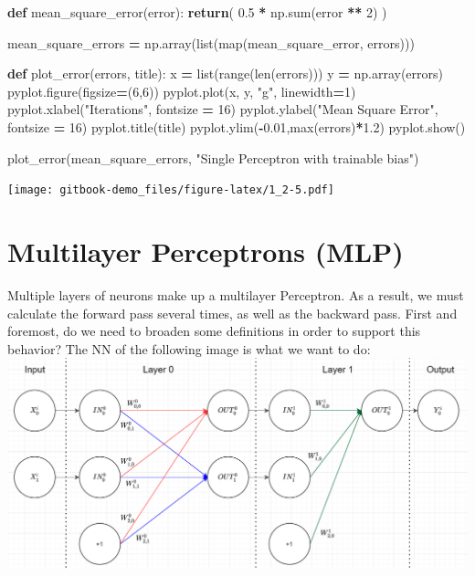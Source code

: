 \documentclass[
]{book}
\newenvironment{Shaded}{\begin{snugshade}}{\end{snugshade}}
\newcommand{\BuiltInTok}[1]{#1}
\newcommand{\ControlFlowTok}[1]{\textcolor[rgb]{0.13,0.29,0.53}{\textbf{#1}}}
\newcommand{\DecValTok}[1]{\textcolor[rgb]{0.00,0.00,0.81}{#1}}
\newcommand{\FloatTok}[1]{\textcolor[rgb]{0.00,0.00,0.81}{#1}}
\newcommand{\KeywordTok}[1]{\textcolor[rgb]{0.13,0.29,0.53}{\textbf{#1}}}
\newcommand{\NormalTok}[1]{#1}
\newcommand{\OperatorTok}[1]{\textcolor[rgb]{0.81,0.36,0.00}{\textbf{#1}}}
\newcommand{\StringTok}[1]{\textcolor[rgb]{0.31,0.60,0.02}{#1}}
\begin{document}
\begin{Shaded}
\begin{Highlighting}[]
  
  
\KeywordTok{def}\NormalTok{ mean\_square\_error(error):}
  \ControlFlowTok{return}\NormalTok{( }\FloatTok{0.5} \OperatorTok{*}\NormalTok{ np.}\BuiltInTok{sum}\NormalTok{(error }\OperatorTok{**} \DecValTok{2}\NormalTok{) )}


\NormalTok{mean\_square\_errors }\OperatorTok{=}\NormalTok{ np.array(}\BuiltInTok{list}\NormalTok{(}\BuiltInTok{map}\NormalTok{(mean\_square\_error, errors)))}


\KeywordTok{def}\NormalTok{ plot\_error(errors, title):}
\NormalTok{  x }\OperatorTok{=} \BuiltInTok{list}\NormalTok{(}\BuiltInTok{range}\NormalTok{(}\BuiltInTok{len}\NormalTok{(errors)))}
\NormalTok{  y }\OperatorTok{=}\NormalTok{ np.array(errors)}
\NormalTok{  pyplot.figure(figsize}\OperatorTok{=}\NormalTok{(}\DecValTok{6}\NormalTok{,}\DecValTok{6}\NormalTok{))}
\NormalTok{  pyplot.plot(x, y, }\StringTok{"g"}\NormalTok{, linewidth}\OperatorTok{=}\DecValTok{1}\NormalTok{)}
\NormalTok{  pyplot.xlabel(}\StringTok{"Iterations"}\NormalTok{, fontsize }\OperatorTok{=} \DecValTok{16}\NormalTok{)}
\NormalTok{  pyplot.ylabel(}\StringTok{"Mean Square Error"}\NormalTok{, fontsize }\OperatorTok{=} \DecValTok{16}\NormalTok{)}
\NormalTok{  pyplot.title(title)}
\NormalTok{  pyplot.ylim(}\OperatorTok{{-}}\FloatTok{0.01}\NormalTok{,}\BuiltInTok{max}\NormalTok{(errors)}\OperatorTok{*}\FloatTok{1.2}\NormalTok{)}
\NormalTok{  pyplot.show()}
  
  
\NormalTok{plot\_error(mean\_square\_errors, }\StringTok{"Single Perceptron with trainable bias"}\NormalTok{)}
\end{Highlighting}
\end{Shaded}

\texttt{[image: gitbook-demo\_files/figure-latex/1\_2-5.pdf]}

\hypertarget{multilayer-perceptrons-mlp}{%
\chapter{Multilayer Perceptrons (MLP)}\label{multilayer-perceptrons-mlp}}

Multiple layers of neurons make up a multilayer Perceptron. As a result, we must calculate the forward pass several times, as well as the backward pass. First and foremost, do we need to broaden some definitions in order to support this behavior? The NN of the following image is what we want to do:\\
\includegraphics[width=1\textwidth,height=\textheight]{./img/NN_03_new.png}
\end{document}
